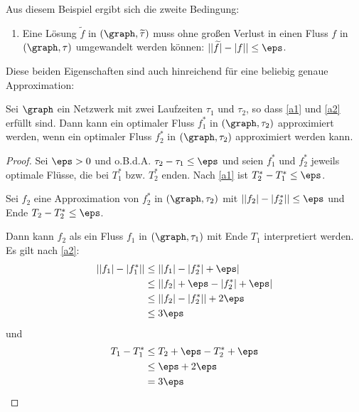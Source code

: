 Aus diesem Beispiel ergibt sich die zweite Bedingung:
\begin{framed}
\begin{enumerate}[start=2, label={(A\arabic*)}]
    \item Eine Lösung $\widetilde{f}$ in $(\graph, \widetilde{\tau})$ muss
        ohne großen Verlust in einen Fluss $f$ in $(\graph, \tau)$
        umgewandelt werden können: $||\widetilde{f}| - |f|| \leq \eps$.
        \label{a2}
\end{enumerate}
\end{framed}

Diese beiden Eigenschaften sind auch hinreichend für eine beliebig genaue
Approximation:
\begin{corollary}
    Sei $\graph$ ein Netzwerk mit zwei Laufzeiten $\tau_1$ und $\tau_2$, so dass
    \ref{a1} und \ref{a2} erfüllt sind.
    Dann kann ein optimaler Fluss $f_1^*$ in $(\graph, \tau_2)$ approximiert werden,
    wenn ein optimaler Fluss $f_2^*$ in $(\graph, \tau_2)$ approximiert werden kann.

    \begin{proof}    
        Sei $\eps > 0$ und o.B.d.A. $\tau_2 - \tau_1 \leq \eps$ und seien
        $f_1^*$ und $f_2^*$ jeweils optimale Flüsse, die bei
        $T_1^*$ bzw. $T_2^*$ enden. Nach \ref{a1} ist $T_2^* - T_1^*\leq \eps$.

        Sei $f_2$ eine Approximation von $f_2^*$ in $(\graph, \tau_2)$ mit
        $||f_2| - |f_2^*|| \leq \eps$ und Ende $T_2 - T_2^* \leq \eps$.

        Dann kann $f_2$ als ein Fluss $f_1$ in $(\graph, \tau_1)$
        mit Ende $T_1$ interpretiert werden. Es gilt nach \ref{a2}:
        \begin{align*}
            ||f_1| - |f_1^*|| & \leq ||f_1| - |f_2^*| + \eps| \\
                            & \leq ||f_2| + \eps - |f_2^*| + \eps| \\
                            & \leq ||f_2| - |f_2^*|| + 2 \eps \\
                            & \leq 3 \eps
        \end{align*}
        und
        \begin{align*}
            T_1 - T_1^*  & \leq T_2 + \eps - T_2^* + \eps \\
                & \leq \eps + 2\eps \\
                & = 3 \eps
        \end{align*}
        

\end{proof}
\end{corollary}

